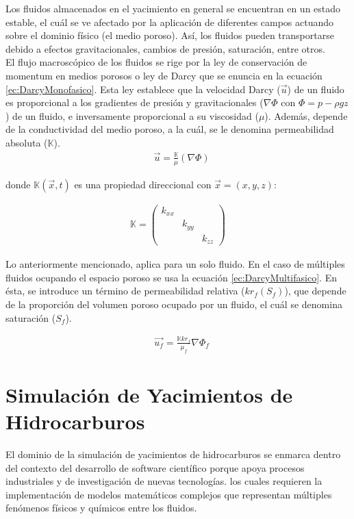Los fluidos almacenados en el yacimiento en general se encuentran en un estado estable, el cuál se ve afectado por la aplicación de diferentes campos actuando sobre el dominio físico (el medio poroso). Así, los fluidos pueden transportarse debido a efectos gravitacionales, cambios de presión, saturación, entre otros.\\ %

El flujo macroscópico de los fluidos se rige por la ley de conservación de momentum en medios porosos o ley de Darcy que se enuncia en la ecuación \ref{ec:DarcyMonofasico}. Esta ley establece que la velocidad Darcy ($\vec{u}$) de un fluido es proporcional a los gradientes de presión y gravitacionales ($\nabla{\Phi}$ con $\Phi = p - \rho g z$) de un fluido, e inversamente proporcional a su viscosidad ($\mu$). Además, depende de la conductividad del medio poroso, a la cuál, se le denomina permeabilidad absoluta ($\mathbb{K}$).
\begin{align}
	\label{ec:DarcyMonofasico} & \vec{u}=\frac{\mathbb{K}}{\mu } \left(\nabla{\Phi}\right)	
\end{align}


donde $\mathbb{K}(\vec{x},t)$ es una propiedad direccional con $\vec{x}=(x,y,z)$:
 
\begin{align}
	\mathbb{K} = \left(\begin{array}{ccc}k_{xx}& & \\
	& k_{yy} & \\
	& & k_{zz}
	\end{array}\right)
\end{align}

Lo anteriormente mencionado, aplica para un solo fluido. En el caso de múltiples fluidos ocupando el espacio poroso se usa la ecuación \ref{ec:DarcyMultifasico}. En ésta, se introduce un término de permeabilidad relativa ($kr_{f}(S_{f})$), que depende de la proporción del volumen poroso ocupado por un fluido, el cuál se denomina saturación ($S_{f}$).

\begin{align}
\label{ec:DarcyMultifasico} & \vec{u_{f}}=\frac{\mathbb{K}kr_{f}}{\mu_{f} } \nabla{\Phi_{f}}
\end{align}

\section{Simulación de Yacimientos de Hidrocarburos}
El dominio de la simulación de yacimientos de hidrocarburos se enmarca dentro del contexto del desarrollo de software científico porque apoya procesos industriales y de investigación de nuevas tecnologías. los cuales requieren la implementación de modelos matemáticos complejos que representan múltiples fenómenos físicos y químicos entre los fluidos.\\

